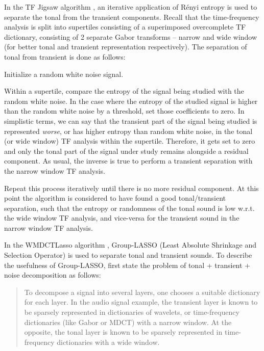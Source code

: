 \documentclass[letter,12pt]{article}
\newenvironment{tight_enumerate}{
\begin{enumerate}
  \setlength{\itemsep}{0pt}
  \setlength{\parskip}{0pt}
}{\end{enumerate}}
\begin{document}
In the TF Jigsaw algorithm \cite{tfjigsaw}, an iterative application of R{\'e}nyi entropy is used to separate the tonal from the transient components. Recall that the time-frequency analysis is split into supertiles consisting of a superimposed overcomplete TF dictionary, consisting of 2 separate Gabor transforms -- narrow and wide window (for better tonal and transient representation respectively). The separation of tonal from transient is done as follows:

\begin{tight_enumerate}
	\item
		Initialize a random white noise signal.
	\item
		Within a supertile, compare the entropy of the signal being studied with the random white noise. In the case where the entropy of the studied signal is higher than the random white noise by a threshold, set those coefficients to zero. In simplistic terms, we can say that the transient part of the signal being studied is represented \textit{worse}, or has higher entropy than random white noise, in the tonal (or wide window) TF analysis within the supertile. Therefore, it gets set to zero and only the tonal part of the signal under study remains alongside a residual component. As usual, the inverse is true to perform a transient separation with the narrow window TF analysis.
	\item
		Repeat this process iteratively until there is no more residual component. At this point the algorithm is considered to have found a good tonal/transient separation, such that the entropy or randomness of the tonal sound is low w.r.t. the wide window TF analysis, and vice-versa for the transient sound in the narrow window TF analysis.
\end{tight_enumerate}

In the WMDCTLasso algorithm \cite{wmdct}, Group-LASSO (Least Absolute Shrinkage and Selection Operator) is used to separate tonal and transient sounds. To describe the usefulness of Group-LASSO, \citet{sparsitykowalski} first state the problem of tonal + transient + noise decomposition as follows:

\begin{quote}
To decompose a signal into several layers, one chooses a suitable dictionary for each layer. In the audio signal example, the transient layer is known to be sparsely represented in dictionaries of wavelets, or time-frequency dictionaries (like Gabor or MDCT) with a narrow window. At the opposite, the tonal layer is known to be sparsely represented in time-frequency dictionaries with a wide window.
\end{quote}
\end{document}
